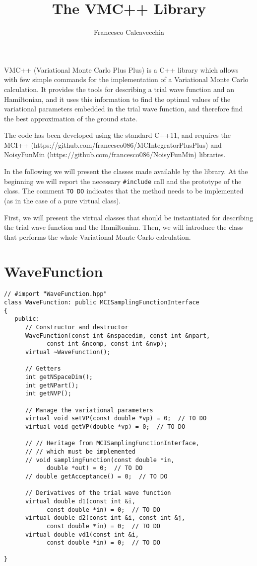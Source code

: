 \documentclass[11pt,a4paper,twoside]{article}
\title{The VMC++ Library}
\author{Francesco Calcavecchia}
\begin{document}
\maketitle

VMC++ (Variational Monte Carlo Plus Plus) is a C++ library which allows with few simple commands for the implementation of a Variational Monte Carlo calculation.
It provides the tools for describing a trial wave function and an Hamiltonian, and it uses this information to find the optimal values of the variational parameters embedded in the trial wave function, and therefore find the best approximation of the ground state.

The code has been developed using the standard C++11, and requires the MCI++ (https://github.com/francesco086/MCIntegratorPlusPlus) and NoisyFunMin (https://github.com/francesco086/NoisyFunMin) libraries.

In the following we will present the classes made available by the library.
At the beginning we will report the necessary \verb+#include+ call and the prototype of the class.
The comment \verb+TO DO+ indicates that the method needs to be implemented (as in the case of a pure virtual class).

First, we will present the virtual classes that should be instantiated for describing the trial wave function and the Hamiltonian.
Then, we will introduce the class that performs the whole Variational Monte Carlo calculation.


\section{WaveFunction} %
\label{sec:wave_function}

\begin{lstlisting}
// #import "WaveFunction.hpp"
class WaveFunction: public MCISamplingFunctionInterface
{
   public:
      // Constructor and destructor
      WaveFunction(const int &nspacedim, const int &npart, 
            const int &ncomp, const int &nvp);
      virtual ~WaveFunction();
      
      // Getters
      int getNSpaceDim();
      int getNPart();
      int getNVP();
      
      // Manage the variational parameters
      virtual void setVP(const double *vp) = 0;  // TO DO
      virtual void getVP(double *vp) = 0;  // TO DO
      
      // // Heritage from MCISamplingFunctionInterface, 
      // // which must be implemented
      // void samplingFunction(const double *in, 
            double *out) = 0;  // TO DO
      // double getAcceptance() = 0;  // TO DO
      
      // Derivatives of the trial wave function
      virtual double d1(const int &i, 
            const double *in) = 0;  // TO DO
      virtual double d2(const int &i, const int &j, 
            const double *in) = 0;  // TO DO
      virtual double vd1(const int &i, 
            const double *in) = 0;  // TO DO
      
}
\end{lstlisting}
\end{document}

